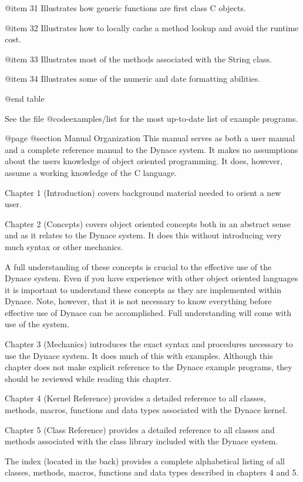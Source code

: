 @item 31
Illustrates how generic functions are first class C objects.

@item 32
Illustrates how to locally cache a method lookup and avoid the
runtime cost.

@item 33
Illustrates most of the methods associated with the String class.

@item 34
Illustrates some of the numeric and date formatting abilities.

@end table


See the file @code{examples/list} for the most up-to-date list
of example programs.


@page
@section Manual Organization
This manual serves as both a user manual and a complete reference manual
to the Dynace system.  It makes no assumptions about the users knowledge
of object oriented programming.  It does, however, assume a working
knowledge of the C language.

Chapter 1 (Introduction) covers background material needed to orient
a new user.

Chapter 2 (Concepts) covers object oriented concepts both in an abstract
sense and as it relates to the Dynace system.  It does this without
introducing very much syntax or other mechanics.

A full understanding of these concepts is crucial to the effective use
of the Dynace system.  Even if you have experience with other object
oriented languages it is important to understand these concepts as they
are implemented within Dynace.  Note, however, that it is not necessary to
know everything before effective use of Dynace can be accomplished.  Full
understanding will come with use of the system.

Chapter 3 (Mechanics) introduces the exact syntax and procedures
necessary to use the Dynace system.  It does much of this with examples.
Although this chapter does not make explicit reference to the Dynace example
programs, they should be reviewed while reading this chapter.

Chapter 4 (Kernel Reference) provides a detailed reference to all
classes, methods, macros, functions and data types associated with
the Dynace kernel.

Chapter 5 (Class Reference)  provides a detailed reference to all
classes and methods associated with the class library included
with the Dynace system.

The index (located in the back) provides a complete alphabetical
listing of all classes, methods, macros, functions and data types
described in chapters 4 and 5.






